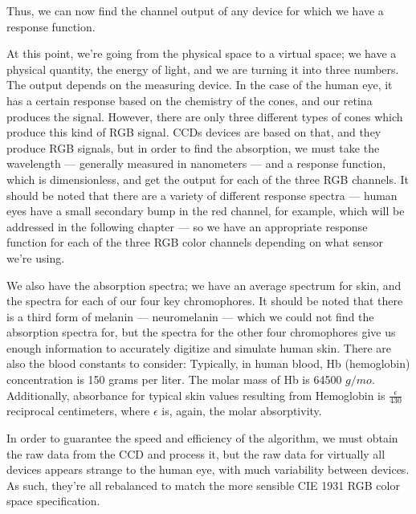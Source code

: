 Thus, we can now find the channel output of any device for which we have a response function.

At this point, we're going from the physical space to a virtual space; we have a physical quantity, the energy of light, and we are turning it into three numbers. The output depends on the measuring device. In the case of the human eye, it has a certain response based on the chemistry of the cones, and our retina produces the signal. However, there are only three different types of cones which produce this kind of RGB signal. CCDs devices are based on that, and they produce RGB signals, but in order to find the absorption, we must take the wavelength --- generally measured in nanometers --- and a response function, which is dimensionless, and get the output for each of the three RGB channels. It should be noted that there are a variety of different response spectra --- human eyes have a small secondary bump in the red channel, for example, which will be addressed in the following chapter --- so we have an appropriate response function for each of the three RGB color channels depending on what sensor we're using.

We also have the absorption spectra; we have an average spectrum for skin, and the spectra for each of our four key chromophores. It should be noted that there is a third form of melanin --- neuromelanin --- which we could not find the absorption spectra for, but the spectra for the other four chromophores give us enough information to accurately digitize and simulate human skin. There are also the blood constants to consider: Typically, in human blood, Hb (hemoglobin) concentration is 150 grams per liter. The molar mass of Hb is 64500 $g/mo$. Additionally, absorbance for typical skin values resulting from Hemoglobin is $\frac{\epsilon}{430}$ reciprocal centimeters, where $\epsilon$ is, again, the molar absorptivity.

In order to guarantee the speed and efficiency of the algorithm, we must obtain the raw data from the CCD and process it, but the raw data for virtually all devices appears strange to the human eye, with much variability between devices. As such, they're all rebalanced to match the more sensible CIE 1931 RGB color space specification.









